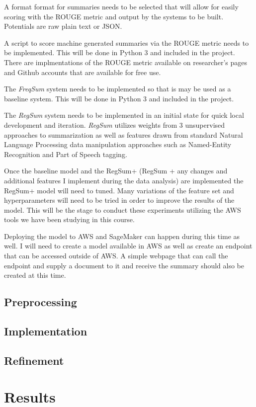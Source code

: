 \documentclass{article}
\begin{document}
A format format for summaries needs to be selected that will allow for easily
scoring with the ROUGE metric and output by the systems to be built. Potentials
are raw plain text or JSON\@.

A script to score machine generated summaries via the ROUGE metric needs to be
implemented. This will be done in Python 3 and included in the project.
There are implmentations of the ROUGE metric available on researcher's pages
and Github accounts that are available for free use.

The \emph{FreqSum} system needs to be implemented so that is may be used as
a baseline system. This will be done in Python 3 and included in the project.

The \emph{RegSum}\cite{RegSum} system needs to be implemented in an initial state for quick local
development and iteration. \emph{RegSum} utilizes weights from 3 unsupervised
approaches to summarization as well as features drawn from standard Natural
Language Processing data manipulation approaches such as Named-Entity
Recognition and Part of Speech tagging.

Once the baseline model and the RegSum+ (RegSum + any changes and additional
features I implement during the data analysis) are implemented the RegSum+ model
will need to tuned. Many variations of the feature set and hyperparameters will
need to be tried in order to improve the results of the model. This will be the
stage to conduct these experiments utilizing the AWS tools we have been
studying in this course.

Deploying the model to AWS and SageMaker can happen during this time as well.
I will need to create a model available in AWS as well as create an endpoint
that can be accessed outside of AWS\@. A simple webpage that can call the endpoint
and supply a document to it and receive the summary should also be created at
this time.

\subsection{Preprocessing}
\subsection{Implementation}
\subsection{Refinement}

\section{Results}
\end{document}
